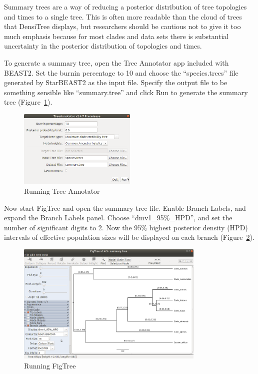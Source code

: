 \documentclass[12pt]{article}
\begin{document}
Summary trees are a way of reducing a posterior distribution of tree
topologies and times to a single tree. This is often more readable than the
cloud of trees that DensiTree displays, but researchers should be cautious not
to give it too much emphasis because for most clades and data
sets there is substantial uncertainty in the posterior distribution of
topologies and times.

To generate a summary tree, open the Tree Annotator app included with BEAST2.
Set the burnin percentage to 10 and choose the ``species.trees'' file generated by
StarBEAST2 as the input file. Specify the output file to be something sensible
like ``summary.tree'' and click Run to generate the summary tree
(Figure~\ref{fig:treeAnnotator}).

\begin{figure}[htb!]
\centering
\includegraphics[width=0.5\textwidth]{figures/treeAnnotator.png}
\caption
{Running Tree Annotator}
\label{fig:treeAnnotator}
\end{figure}

\newpage{}

Now start FigTree and open the summary tree file. Enable Branch Labels,
and expand the Branch Labels panel. Choose ``dmv1\_95\%\_HPD'', and set
the number of significant digits to 2. Now the 95\% highest posterior
density (HPD) intervals of
effective population sizes will be displayed on each branch
(Figure~\ref{fig:figtree}).

\begin{figure}[htb!]
\centering
\includegraphics[width=0.8\textwidth]{figures/figtree.png}
\caption
{Running FigTree}
\label{fig:figtree}
\end{figure}
\end{document}
